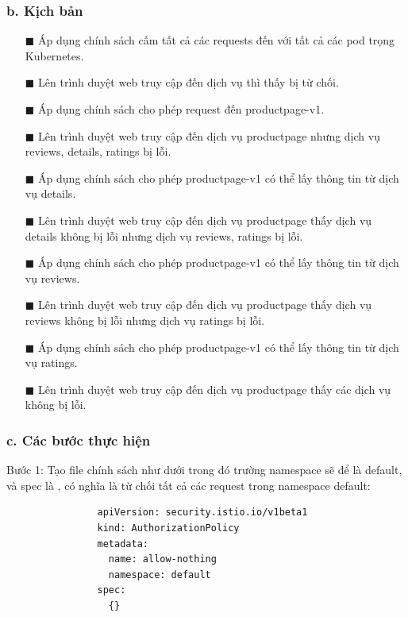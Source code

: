 \documentclass[12pt,a4paper]{report}
\begin{document}
{{			\subsubsection{b. Kịch bản}
			\begin{enumerate}
				\item[$\blacksquare$] Áp dụng chính sách cấm tất cả các requests đến với tất cả các pod trọng Kubernetes.
				\item[$\blacksquare$] Lên trình duyệt web truy cập đến dịch vụ thì thấy bị từ chối.
				\item[$\blacksquare$] Áp dụng chính sách cho phép request đến productpage-v1.
				\item[$\blacksquare$] Lên trình duyệt web truy cập đến dịch vụ productpage nhưng dịch vụ reviews, details, ratings bị lỗi.
				\item[$\blacksquare$] Áp dụng chính sách cho phép productpage-v1 có thể lấy thông tin từ dịch vụ details.
				\item[$\blacksquare$] Lên trình duyệt web truy cập đến dịch vụ productpage thấy dịch vụ details không bị lỗi nhưng dịch vụ reviews, ratings bị lỗi.
				\item[$\blacksquare$] Áp dụng chính sách cho phép productpage-v1 có thể lấy thông tin từ dịch vụ reviews.
				\item[$\blacksquare$] Lên trình duyệt web truy cập đến dịch vụ productpage thấy dịch vụ reviews không bị lỗi nhưng dịch vụ ratings bị lỗi.
				\item[$\blacksquare$] Áp dụng chính sách cho phép productpage-v1 có thể lấy thông tin từ dịch vụ ratings.
				\item[$\blacksquare$] Lên trình duyệt web truy cập đến dịch vụ productpage thấy các dịch vụ không bị lỗi. 
			\end{enumerate}
			\subsubsection{c. Các bước thực hiện}
				Bước 1: Tạo file chính sách như dưới trong đó trường namespace sẽ để là default, và spec là {}, có nghĩa là từ chối tất cả các request trong namespace default:
				\begin{lstlisting}
				apiVersion: security.istio.io/v1beta1
				kind: AuthorizationPolicy
				metadata:
				  name: allow-nothing
				  namespace: default
				spec:
				  {}
				\end{lstlisting}
						
}}
\end{document}
